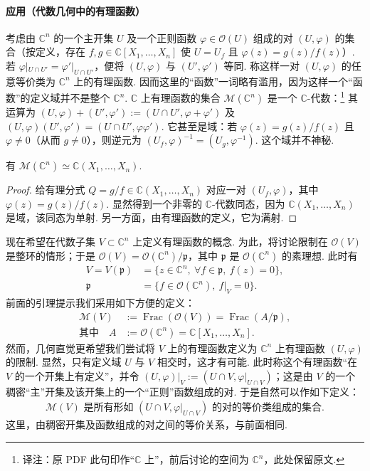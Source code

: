 \paragraph{应用（代数几何中的有理函数）}
考虑由 $\mathbb C^n$ 的一个主开集 $U$ 及一个正则函数 $\varphi\in\mathcal O(U)$ 组成的对 $(U,\varphi)$ 的集合（按定义，存在 $f,g\in\mathbb C[X_1,\ldots,X_n]$ 使 $U=U_f$ 且 $\varphi(z)=g(z)/f(z)$）. 若 $\varphi|_{U\cap U'}=\varphi'|_{U\cap U'}$，便将 $(U,\varphi)$ 与 $(U',\varphi')$ 等同. 称这样一对 $(U,\varphi)$ 的任意等价类为 $\mathbb C^n$ 上的有理函数. 因而这里的``函数''一词略有滥用，因为这样一个``函数''的定义域并不是整个 $\mathbb C^n$. $\mathbb C$ 上有理函数的集合 $\mathcal M(\mathbb C^n)$ 是一个 $\mathbb C$-代数：\footnote{译注：原 PDF 此句印作``$\mathbb C$ 上''，前后讨论的空间为 $\mathbb C^n$，此处保留原文.} 其运算为 $(U,\varphi)+(U',\varphi'):=(U\cap U',\varphi+\varphi')$ 及 $(U,\varphi)(U',\varphi')=(U\cap U',\varphi\varphi')$. 它甚至是域：若 $\varphi(z)=g(z)/f(z)$ 且 $\varphi\ne0$（从而 $g\ne0$），则逆元为 $(U_f,\varphi)^{-1}=(U_g,\varphi^{-1})$. 这个域并不神秘.
\begin{lemma*}
有 $\mathcal M(\mathbb C^n)\simeq\mathbb C(X_1,\ldots,X_n)$.
\end{lemma*}
\begin{proof}
给有理分式 $Q=g/f\in\mathbb C(X_1,\ldots,X_n)$ 对应一对 $(U_f,\varphi)$，其中 $\varphi(z)=g(z)/f(z)$. 显然得到一个非零的 $\mathbb C$-代数同态，因为 $\mathbb C(X_1,\ldots,X_n)$ 是域，该同态为单射. 另一方面，由有理函数的定义，它为满射.
\end{proof}
现在希望在代数子集 $V\subset\mathbb C^n$ 上定义有理函数的概念. 为此，将讨论限制在 $\mathcal O(V)$ 是整环的情形；于是 $\mathcal O(V)=\mathcal O(\mathbb C^n)/\mathfrak p$，其中 $\mathfrak p$ 是 $\mathcal O(\mathbb C^n)$ 的素理想. 此时有
\begin{align*}
V=V(\mathfrak p)&=\{z\in\mathbb C^n,\ \forall f\in\mathfrak p,\ f(z)=0\},\\
\mathfrak p&=\{f\in\mathcal O(\mathbb C^n),\ f|_V=0\}.
\end{align*}
前面的引理提示我们采用如下方便的定义：
\begin{align*}
\mathcal M(V)&:=\operatorname{Frac}(\mathcal O(V))=\operatorname{Frac}(A/\mathfrak p),\tag{1}\label{eq:galois-s06-rational-definition-1}\\
\text{其中}\quad A&:=\mathcal O(\mathbb C^n)=\mathbb C[X_1,\ldots,X_n].
\end{align*}
然而，几何直觉更希望我们尝试将 $V$ 上的有理函数定义为 $\mathbb C^n$ 上有理函数 $(U,\varphi)$ 的限制. 显然，只有定义域 $U$ 与 $V$ 相交时，这才有可能. 此时称这个有理函数``在 $V$ 的一个开集上有定义''，并令 $(U,\varphi)|_V:=(U\cap V,\varphi|_{U\cap V})$；这是由 $V$ 的一个稠密``主''开集及该开集上的一个``正则''函数组成的对. 于是自然可以作如下定义：
\begin{align*}
\mathcal M(V)\text{ 是所有形如 }(U\cap V,\varphi|_{U\cap V})\text{ 的对的等价类组成的集合}.\tag{2}\label{eq:galois-s06-rational-definition-2}
\end{align*}
这里，由稠密开集及函数组成的对之间的等价关系，与前面相同.

